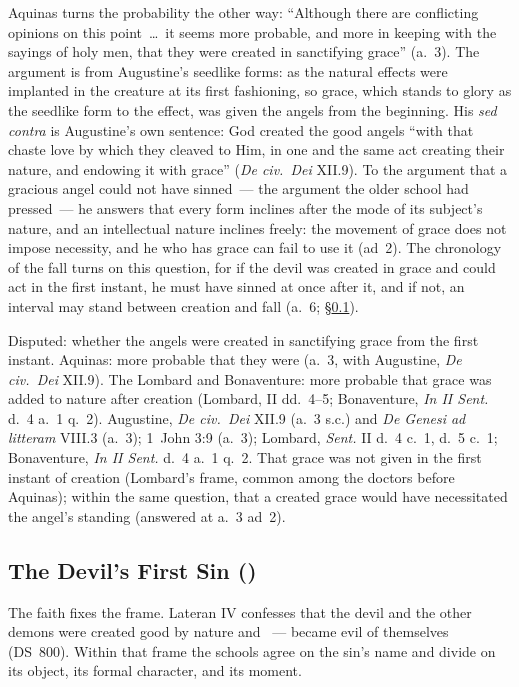 Aquinas turns the probability the other way: ``Although there are
conflicting opinions on this point~\dots\ it seems more probable, and
more in keeping with the sayings of holy men, that they were created in
sanctifying grace'' (a.~3). The argument is from Augustine's seedlike
forms: as the natural effects were implanted in the creature at its first
fashioning, so grace, which stands to glory as the seedlike form to the
effect, was given the angels from the beginning. His \emph{sed contra} is
Augustine's own sentence: God created the good angels
``with that chaste love by which they cleaved to Him, in one and the same
act creating their nature, and endowing it with grace'' (\emph{De civ.\
Dei} XII.9). To the argument that a gracious angel could not have sinned~---
the argument the older school had pressed~--- he answers that every
form inclines after the mode of its subject's nature, and an intellectual
nature inclines freely: the movement of grace does not impose necessity,
and he who has grace can fail to use it (ad~2). The chronology of the
fall turns on this question, for if the devil was
created in grace and could act in the first instant, he must have sinned
at once after it, and if not, an interval may stand between creation and
fall (a.~6; \S\ref{sec:dq-firstsin}).

 {Disputed: whether the angels were created in sanctifying grace from
  the first instant. Aquinas: more probable that they were (a.~3, with
  Augustine, \emph{De civ.\ Dei} XII.9). The Lombard and Bonaventure:
  more probable that grace was added to nature after creation (Lombard,
  II dd.~4--5; Bonaventure, \emph{In II Sent.} d.~4 a.~1 q.~2).}
 {Augustine, \emph{De civ.\ Dei} XII.9 (a.~3 s.c.) and \emph{De Genesi ad
  litteram} VIII.3 (a.~3); 1~John 3:9 (a.~3); Lombard, \emph{Sent.} II
  d.~4 c.~1, d.~5 c.~1; Bonaventure, \emph{In II Sent.} d.~4 a.~1 q.~2.}
 {That grace was not given in the first instant of creation (Lombard's
  frame, common among the doctors before Aquinas); within the same
  question, that a created grace would have necessitated the angel's
  standing (answered at a.~3 ad~2).}

\subsection{The Devil's First Sin ()}\label{sec:dq-firstsin}

The faith fixes the frame. Lateran IV confesses that the devil and the
other demons were created good by nature and \latin{ipsi per se facti
sunt mali}~--- became evil of themselves (DS~800). Within that frame the
schools agree on the sin's name and divide on its object, its formal
character, and its moment.

